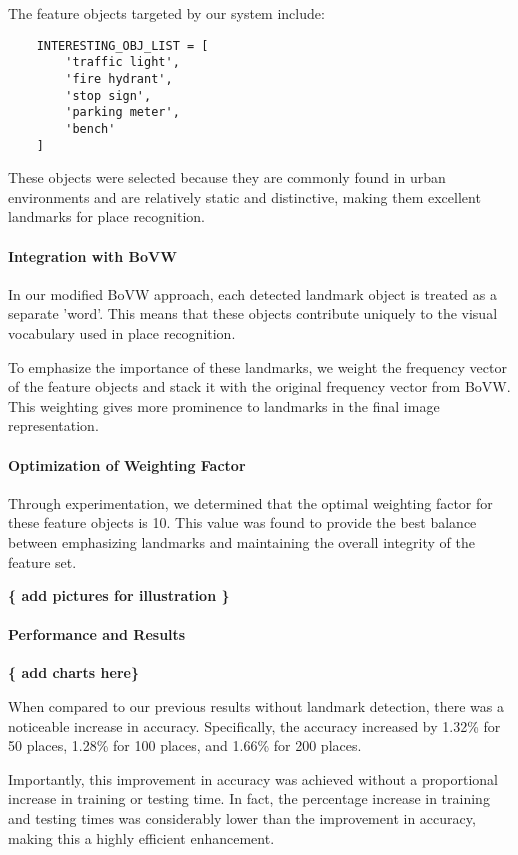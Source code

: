 \documentclass[conference]{IEEEtran}
\begin{document}
The feature objects targeted by our system include:

\begin{verbatim}
    INTERESTING_OBJ_LIST = [
        'traffic light',
        'fire hydrant',
        'stop sign',
        'parking meter',
        'bench'
    ]
\end{verbatim}

These objects were selected because they are commonly found in urban environments and are relatively static and distinctive, making them excellent landmarks for place recognition.

\paragraph{Integration with BoVW}

In our modified BoVW approach, each detected landmark object is treated as a separate 'word'. This means that these objects contribute uniquely to the visual vocabulary used in place recognition.

To emphasize the importance of these landmarks, we weight the frequency vector of the feature objects and stack it with the original frequency vector from BoVW. This weighting gives more prominence to landmarks in the final image representation.

\paragraph{Optimization of Weighting Factor}

Through experimentation, we determined that the optimal weighting factor for these feature objects is 10. This value was found to provide the best balance between emphasizing landmarks and maintaining the overall integrity of the feature set.

\textbf{ \{ add pictures for illustration \} }

\paragraph{Performance and Results}

\textbf{ \{ add charts here\} }

When compared to our previous results without landmark detection, there was a noticeable increase in accuracy. Specifically, the accuracy increased by 1.32\% for 50 places, 1.28\% for 100 places, and 1.66\% for 200 places.

Importantly, this improvement in accuracy was achieved without a proportional increase in training or testing time. In fact, the percentage increase in training and testing times was considerably lower than the improvement in accuracy, making this a highly efficient enhancement.
\end{document}
